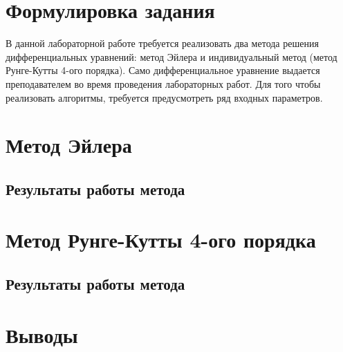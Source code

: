 \documentclass[a4paper]{article}
\newcommand{\includeimage}[3]{
    \begin{center}
        \texttt{[image: \#1]}
        \captionof{figure}{#3}
        \label{#2}
    \end{center}
}
\begin{document}
\tableofcontents

\pagebreak

\section{Формулировка задания}
В данной лабораторной работе требуется реализовать два метода решения дифференциальных уравнений: метод Эйлера и индивидуальный метод (метод Рунге-Кутты 4-ого порядка). Само дифференциальное уравнение выдается преподавателем во время проведения лабораторных работ. Для того чтобы реализовать алгоритмы, требуется предусмотреть ряд входных параметров.

\section{Метод Эйлера}


\subsection{Результаты работы метода}

\section{Метод Рунге-Кутты 4-ого порядка}


\subsection{Результаты работы метода}

\pagebreak

\section{Выводы}
\end{document}
